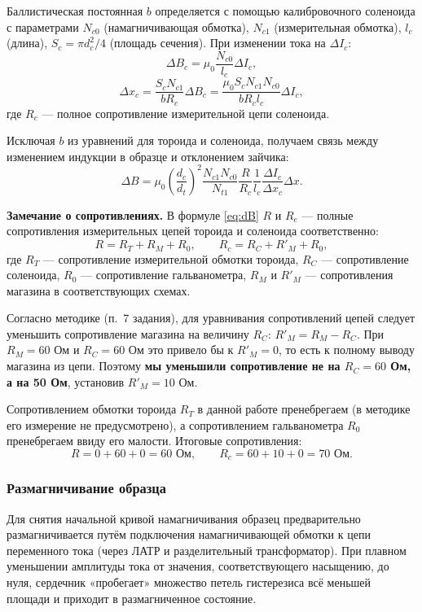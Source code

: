 \documentclass[a4paper]{article}
\begin{document}
Баллистическая постоянная $b$ определяется с помощью калибровочного соленоида с параметрами $N_{c0}$ (намагничивающая обмотка), $N_{c1}$ (измерительная обмотка), $l_c$ (длина), $S_c = \pi d_c^2/4$ (площадь сечения). При изменении тока на $\Delta I_c$:
\[
\Delta B_c = \mu_0 \frac{N_{c0}}{l_c} \Delta I_c,
\]
\[
\Delta x_c = \frac{S_c N_{c1}}{b R_c} \Delta B_c = \frac{\mu_0 S_c N_{c1} N_{c0}}{b R_c l_c} \Delta I_c,
\]
где $R_c$ — полное сопротивление измерительной цепи соленоида.

Исключая $b$ из уравнений для тороида и соленоида, получаем связь между изменением индукции в образце и отклонением зайчика:
\begin{equation}
\Delta B = \mu_0 \left(\frac{d_c}{d_t}\right)^2 \frac{N_{c1} N_{c0}}{N_{t1}} \frac{R}{R_c} \frac{1}{l_c} \frac{\Delta I_c}{\Delta x_c} \Delta x.
\label{eq:dB}
\end{equation}

\textbf{Замечание о сопротивлениях.} В формуле \eqref{eq:dB} $R$ и $R_c$ — полные сопротивления измерительных цепей тороида и соленоида соответственно:
\[
R = R_T + R_M + R_0, \qquad R_c = R_C + R'_M + R_0,
\]
где $R_T$ — сопротивление измерительной обмотки тороида, $R_C$ — сопротивление соленоида, $R_0$ — сопротивление гальванометра, $R_M$ и $R'_M$ — сопротивления магазина в соответствующих схемах.

Согласно методике (п.~7 задания), для уравнивания сопротивлений цепей следует уменьшить сопротивление магазина на величину $R_C$: $R'_M = R_M - R_C$. При $R_M = 60$ Ом и $R_C = 60$ Ом это привело бы к $R'_M = 0$, то есть к полному выводу магазина из цепи. Поэтому \textbf{мы уменьшили сопротивление не на $R_C = 60$ Ом, а на 50 Ом}, установив $R'_M = 10$ Ом.

Сопротивлением обмотки тороида $R_T$ в данной работе пренебрегаем (в методике его измерение не предусмотрено), а сопротивлением гальванометра $R_0$ пренебрегаем ввиду его малости. Итоговые сопротивления:
\[
R = 0 + 60 + 0 = 60 \text{ Ом}, \qquad R_c = 60 + 10 + 0 = 70 \text{ Ом}.
\]

\subsubsection{Размагничивание образца}

Для снятия начальной кривой намагничивания образец предварительно размагничивается путём подключения намагничивающей обмотки к цепи переменного тока (через ЛАТР и разделительный трансформатор). При плавном уменьшении амплитуды тока от значения, соответствующего насыщению, до нуля, сердечник «пробегает» множество петель гистерезиса всё меньшей площади и приходит в размагниченное состояние.
\end{document}
